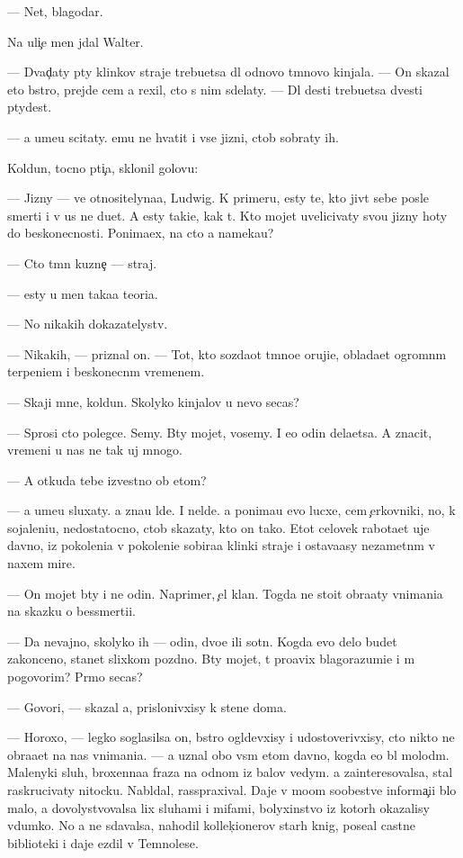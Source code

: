 \documentclass[10pt]{book}
\begin{document}
— Net, blagodar{\io}.

Na uli{\c}e men{\ia} jdal Walter.

— Dvad{\c}aty p{\ia}ty klinkov straje{\y} trebu{\y}etsa dl{\ia} odnovo t{\e}mnovo kinjala. — On skazal eto b{\yi}stro, prejde cem {\y}a rexil, cto s nim sdelaty. — Dl{\ia} des{\ia}ti trebu{\y}etsa dvesti p{\ia}tydes{\ia}t.

— {\Y}a ume{\y}u scitaty. {\Y}emu ne hvatit i vse{\y} jizni, ctob{\yi} sobraty ih.

Koldun, tocno pti{\c}a, sklonil golovu:

— Jizny — ve{\x} otnositelyna{\y}a, Ludwig. K primeru, {\y}esty te, kto jiv{\e}t sebe posle smerti i v us ne du{\y}et. A {\y}esty taki{\y}e, kak t{\yi}. Kto mojet uvelicivaty svo{\y}u jizny hoty do beskonecnosti. Ponima{\y}ex, na cto {\y}a nameka{\y}u?

— Cto t{\e}mn{\yi}{\y} kuzne{\c} — straj.

— {\Y}esty u men{\ia} taka{\y}a teori{\y}a.

— No nikakih dokazatelystv.

— Nikakih, — priznal on. — Tot, kto sozda{\y}ot t{\e}mno{\y}e oruji{\y}e, oblada{\y}et ogrom\-n{\yi}m terpeni{\y}em i beskonecn{\yi}m vremenem.

— Skaji mne, koldun. Skolyko kinjalov u nevo se{\y}cas?

— Sprosi cto polegce. Semy. B{\yi}ty mojet, vosemy. I {\y}e{\x}o odin dela{\y}etsa. A znacit, vremeni u nas ne tak uj mnogo.

— A otkuda tebe izvestno ob etom?

— {\Y}a ume{\y}u sluxaty. {\Y}a zna{\y}u l{\io}de{\y}. I nel{\io}de{\y}. {\Y}a ponima{\y}u {\y}evo lucxe, cem {\c}erkovniki, no, k sojaleni{\y}u, nedostatocno, ctob{\yi} skazaty, kto on tako{\y}. Etot celovek rabota{\y}et uje davno, iz pokoleni{\y}a v pokoleni{\y}e sobira{\y}a klinki straje{\y} i ostava{\y}asy nezametn{\yi}m v naxem mire.

— On mojet b{\yi}ty i ne odin. Naprimer, {\c}el{\yi}{\y} klan. Togda ne stoit obra{\x}aty vnimani{\y}a na skazku o bessmerti{\y}i.

— Da ne\-vaj\-no, skoly\-ko ih — odin, dvo{\y}e ili sotn{\ia}. Kogda {\y}evo delo budet zakonceno, stanet slixkom pozdno. B{\yi}ty mojet, t{\yi} pro{\y}avix blagorazumi{\y}e i m{\yi} po\-go\-vo\-rim? Pr{\ia}mo se{\y}cas?

— Govori, — skazal {\y}a, prislonivxisy k stene doma.

— Horoxo, — legko soglasilsa on, b{\yi}stro ogl{\ia}devxisy i udostoverivxisy, cto nikto ne obra{\x}a{\y}et na nas vnimani{\y}a. — {\Y}a uznal obo vs{\e}m etom davno, kogda {\y}e{\x}o b{\yi}l molod{\yi}m. Malenyki{\y} sluh, broxenna{\y}a fraza na odnom iz balov vedym. {\Y}a zainteresovalsa, stal raskrucivaty nitocku. Nabl{\io}dal, rasspraxival. Daje v mo{\y}om so\-ob\-{\x}e\-stve informa{\c}i{\y}i b{\yi}lo malo, {\y}a dovolystvovalsa lix sluhami i mifami, bolyxinstvo iz kotor{\yi}h okazalisy v{\yi}dumko{\y}. No {\y}a ne sdavalsa, nahodil kollek{\c}ionerov star{\yi}h knig, pose{\x}al castn{\yi}{\y}e biblioteki i daje {\y}ezdil v Temnoles{\y}e.
\end{document}
